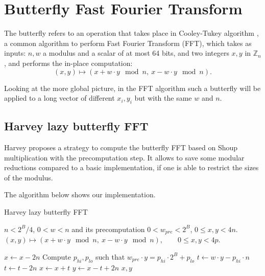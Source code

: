 \documentclass[a4paper]{article}
\begin{document}
\section{Butterfly Fast Fourier Transform}

The butterfly refers to an operation that takes place in Cooley-Tukey algorithm \cite{Cooley_Tukey_1965}, a common algorithm to perform 
Fast Fourier Transform (FFT), which takes as inputs: $n, w$ a modulus and a scalar of at most 64 bits, and two integers 
$x, y$ in $\mathbb{Z}_n$, and performs the in-place computation:
\[
(x,y) \mapsto (x + w\cdot y \mod n,\ x - w\cdot y \mod n).
\]

Looking at the more global picture, in the FFT algorithm such a butterfly will
be applied to a long vector of different \(x_i, y_i\) but with the same \(w\) and \(n\).


\subsection{Harvey lazy butterfly FFT}

Harvey proposes a strategy\cite{DBLP:journals/corr/abs-1205-2926} to compute the butterfly FFT based on Shoup multiplication
with the precomputation step. It allows to save some modular reductions compared to a basic implementation, if one is able to 
restrict the sizes of the modulus.

\bigskip
The algorithm below shows our implementation.

\begin{algorithm}
    \caption{Harvey lazy butterfly FFT}
    \begin{algorithmic}[1]
        \Require $n < 2^B/4$,
        \Require $0 < w < n$ and its precomputation $0 < w_{pre} < 2^B$,
        \Require $0 \leq x, y < 4n$.
        \Ensure $(x,y) \mapsto (x + w\cdot y \mod n,\ x - w\cdot y \mod n), \qquad 0 \leq x,y < 4p.$

            \State $x \gets x - 2n$
        \EndIf
        \State Compute $p_{hi}, p_{lo}$ such that $w_{pre} \cdot y = p_{hi}\cdot 2^B + p_{lo}$ 
        \State $t \gets w\cdot y - p_{hi}\cdot n$ 
            \State $t \gets t - 2n$
        \EndIf
        \State $x \gets x + t$
        \State $y \gets x - t + 2n$
        \State \Return $x,y$
    \end{algorithmic}
\end{algorithm}
\end{document}
